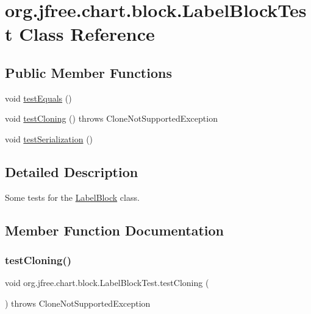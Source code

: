 \hypertarget{classorg_1_1jfree_1_1chart_1_1block_1_1_label_block_test}{}\section{org.\+jfree.\+chart.\+block.\+Label\+Block\+Test Class Reference}
\label{classorg_1_1jfree_1_1chart_1_1block_1_1_label_block_test}
\subsection*{Public Member Functions}
\begin{DoxyCompactItemize}
\item 
void \mbox{\hyperlink{classorg_1_1jfree_1_1chart_1_1block_1_1_label_block_test_ad83461c81cce3750cdbda32d516bead2}{test\+Equals}} ()
\item 
void \mbox{\hyperlink{classorg_1_1jfree_1_1chart_1_1block_1_1_label_block_test_a4d8aee196221f248ad09dedc1bcc902a}{test\+Cloning}} ()  throws Clone\+Not\+Supported\+Exception 
\item 
void \mbox{\hyperlink{classorg_1_1jfree_1_1chart_1_1block_1_1_label_block_test_aa697d315b382176b5ade4b54cce65e07}{test\+Serialization}} ()
\end{DoxyCompactItemize}


\subsection{Detailed Description}
Some tests for the \mbox{\hyperlink{classorg_1_1jfree_1_1chart_1_1block_1_1_label_block}{Label\+Block}} class. 

\subsection{Member Function Documentation}
\mbox{\label{classorg_1_1jfree_1_1chart_1_1block_1_1_label_block_test_a4d8aee196221f248ad09dedc1bcc902a}} 
\subsubsection{\texorpdfstring{test\+Cloning()}{testCloning()}}
{\footnotesize\ttfamily void org.\+jfree.\+chart.\+block.\+Label\+Block\+Test.\+test\+Cloning (\begin{DoxyParamCaption}{ }\end{DoxyParamCaption}) throws Clone\+Not\+Supported\+Exception}

